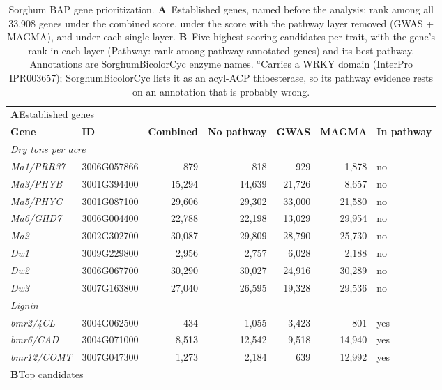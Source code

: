 \begin{table}[!t]
\centering
\caption{Sorghum BAP gene prioritization. \textbf{A}~Established genes, named before the analysis: rank among all 33{,}908 genes under the combined score, under the score with the pathway layer removed (GWAS + MAGMA), and under each single layer. \textbf{B}~Five highest-scoring candidates per trait, with the gene's rank in each layer (Pathway: rank among pathway-annotated genes) and its best pathway. Annotations are SorghumBicolorCyc enzyme names. $^{a}$Carries a WRKY domain (InterPro IPR003657); SorghumBicolorCyc lists it as an acyl-ACP thioesterase, so its pathway evidence rests on an annotation that is probably wrong.}
\label{tab:sorghum_genes}
\small
\begin{tabular}{llrrrrl}
\hline
\multicolumn{7}{l}{\textbf{A}\quad Established genes} \\
\textbf{Gene} & \textbf{ID} & \textbf{Combined} & \textbf{No pathway} & \textbf{GWAS} & \textbf{MAGMA} & \textbf{In pathway} \\
\hline
\multicolumn{7}{l}{\textit{Dry tons per acre}} \\
\textit{Ma1/PRR37} & 3006G057866 & 879 & 818 & 929 & 1{,}878 & no \\
\textit{Ma3/PHYB} & 3001G394400 & 15{,}294 & 14{,}639 & 21{,}726 & 8{,}657 & no \\
\textit{Ma5/PHYC} & 3001G087100 & 29{,}606 & 29{,}302 & 33{,}000 & 21{,}580 & no \\
\textit{Ma6/GHD7} & 3006G004400 & 22{,}788 & 22{,}198 & 13{,}029 & 29{,}954 & no \\
\textit{Ma2} & 3002G302700 & 30{,}087 & 29{,}809 & 28{,}790 & 25{,}730 & no \\
\textit{Dw1} & 3009G229800 & 2{,}956 & 2{,}757 & 6{,}028 & 2{,}188 & no \\
\textit{Dw2} & 3006G067700 & 30{,}290 & 30{,}027 & 24{,}916 & 30{,}289 & no \\
\textit{Dw3} & 3007G163800 & 27{,}040 & 26{,}595 & 19{,}328 & 29{,}536 & no \\
\multicolumn{7}{l}{\textit{Lignin}} \\
\textit{bmr2/4CL} & 3004G062500 & 434 & 1{,}055 & 3{,}423 & 801 & yes \\
\textit{bmr6/CAD} & 3004G071000 & 8{,}513 & 12{,}542 & 9{,}518 & 14{,}940 & yes \\
\textit{bmr12/COMT} & 3007G047300 & 1{,}273 & 2{,}184 & 639 & 12{,}992 & yes \\
\hline
\multicolumn{7}{l}{\textbf{B}\quad Top candidates} \\

\end{tabular}
\end{table}

